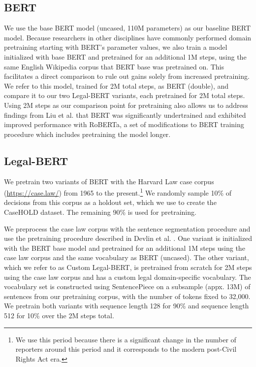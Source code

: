 \documentclass[sigconf]{acmart}
\begin{document}
\subsection{BERT}
We use the base BERT model (uncased, 110M parameters) \cite{devlin-etal-2019-bert} as our baseline BERT model. Because researchers in other disciplines have commonly performed domain pretraining starting with BERT's parameter values, we also train a model initialized with base BERT and pretrained for an additional 1M steps, using the same English Wikipedia corpus that BERT base was pretrained on. This facilitates a direct comparison to rule out gains solely from increased pretraining. We refer to this model, trained for 2M  total steps, as BERT (double), and compare it to our two Legal-BERT variants, each pretrained for 2M total steps. Using 2M steps as our comparison point for pretraining also allows us to address findings from Liu et al. \cite{liu2019roberta} that BERT was significantly undertrained and exhibited improved performance with RoBERTa, a set of modifications to BERT training procedure which includes pretraining the model longer.

\subsection{Legal-BERT}
We pretrain two variants of BERT with the Harvard Law case corpus (\url{https://case.law/}) from 1965 to the present.\footnote{We use this period because there is a significant change in the number of reporters around this period and it corresponds to the modern post-Civil Rights Act era.} We randomly sample 10\% of decisions from this corpus as a holdout set, which we use to create the CaseHOLD dataset. The remaining 90\% is used for pretraining. 

We preprocess the case law corpus with the sentence segmentation procedure and use the pretraining procedure described in Devlin et al. \cite{devlin-etal-2019-bert}. One variant is initialized with the BERT base model and pretrained for an additional 1M steps using the case law corpus and the same vocabulary as BERT (uncased). The other variant, which we refer to as Custom Legal-BERT, is pretrained from scratch for 2M steps using the case law corpus and has a custom legal domain-specific vocabulary. The vocabulary set is constructed using SentencePiece \cite{kudo2018sentencepiece} on a subsample (appx. 13M) of sentences from our pretraining corpus, with the number of tokens fixed to 32,000. We pretrain both variants with sequence length 128 for 90\% and sequence length 512 for 10\% over the 2M steps total.
\end{document}
